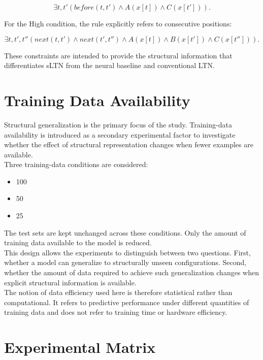 $$
\exists t,t'
\left(
before(t,t')
\land
A(x[t])
\land
C(x[t'])
\right).
$$

\noindent
For the High condition, the rule explicitly refers to consecutive positions:

$$
\exists t,t',t''
\left(
next(t,t')
\land
next(t',t'')
\land
A(x[t])
\land
B(x[t'])
\land
C(x[t''])
\right).
$$

\noindent
These constraints are intended to provide the structural information that differentiates sLTN from the neural baseline and conventional LTN.

\section{Training Data Availability}

\noindent
Structural generalization is the primary focus of the study. Training-data availability is introduced as a secondary experimental factor to investigate whether the effect of structural representation changes when fewer examples are available.
\\
Three training-data conditions are considered:

\begin{itemize}
\item 100%
\item 50%
\item 25%
\end{itemize}

\noindent
The test sets are kept unchanged across these conditions. Only the amount of training data available to the model is reduced.
\\
This design allows the experiments to distinguish between two questions. First, whether a model can generalize to structurally unseen configurations. Second, whether the amount of data required to achieve such generalization changes when explicit structural information is available.
\\
The notion of data efficiency used here is therefore statistical rather than computational. It refers to predictive performance under different quantities of training data and does not refer to training time or hardware efficiency.

\section{Experimental Matrix}

